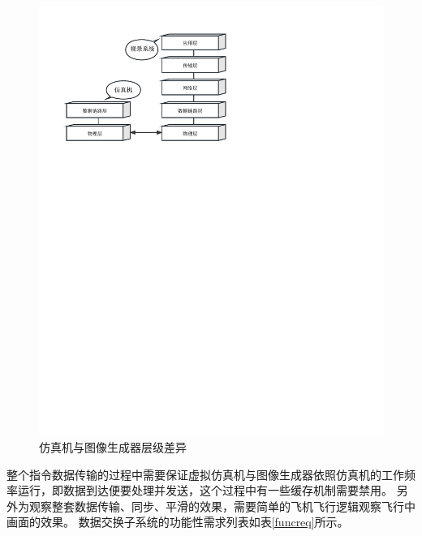 \begin{figure}[h]
    \begin{center}
        \includegraphics[width=.8\textwidth]{pictures/netlayer.pdf}
        \caption{仿真机与图像生成器层级差异}
        \label{netlayer}
    \end{center}
\end{figure}
\par
整个指令数据传输的过程中需要保证虚拟仿真机与图像生成器依照仿真机的工作频率运行，即数据到达便要处理并发送，这个过程中有一些缓存机制需要禁用。
另外为观察整套数据传输、同步、平滑的效果，需要简单的飞机飞行逻辑观察飞行中画面的效果。
数据交换子系统的功能性需求列表如表\ref{funcreq}所示。
